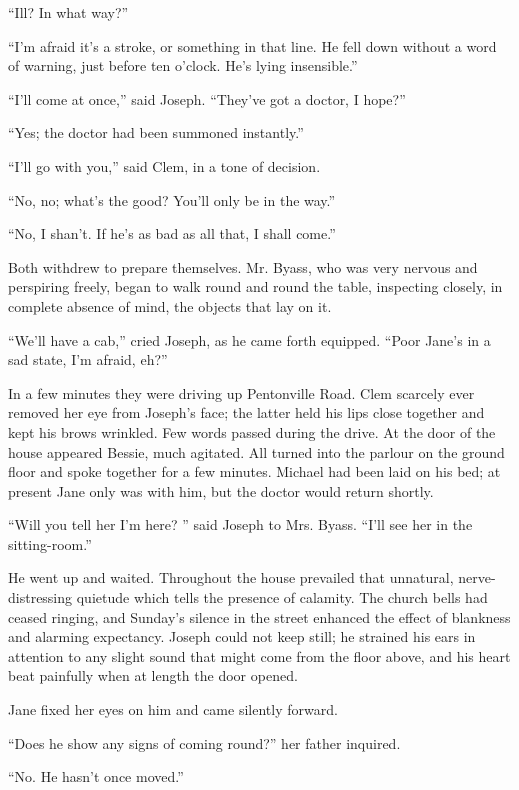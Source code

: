 ``Ill? In what way?''

``I'm afraid it's a stroke, or something in that line. He fell down
without a word of warning, just before ten o'clock. He's lying
insensible.''

``I'll come at once,'' said Joseph. ``They've got a doctor, I hope?''

``Yes; the doctor had been summoned instantly.''

``I'll go with you,'' said Clem, in a tone of decision.

``No, no; what's the good? You'll only be in the way.''

{\protect\hypertarget{161}{}{}}``No, I shan't. If he's as bad as all
that, I shall come.''

Both withdrew to prepare themselves. Mr. Byass, who was very nervous and
perspiring freely, began to walk round and round the table, inspecting
closely, in complete absence of mind, the objects that lay on it.

``We'll have a cab,'' cried Joseph, as he came forth equipped. ``Poor
Jane's in a sad state, I'm afraid, eh?''

In a few minutes they were driving up Pentonville Road. Clem scarcely
ever removed her eye from Joseph's face; the latter held his lips close
together and kept his brows wrinkled. Few words passed during the drive.
At the door of the house appeared Bessie, much agitated. All turned into
the parlour on the ground floor and spoke together for a few minutes.
Michael had been laid on his bed; at present Jane only was with him, but
the doctor would return shortly.

``Will you tell her I'm here? '' said Joseph to Mrs. Byass. ``I'll see
her in the sitting-room.''

He went up and waited. Throughout the house prevailed that unnatural,
nerve-distressing quietude which tells the presence of
{\protect\hypertarget{162}{}{}}calamity. The church bells had ceased
ringing, and Sunday's silence in the street enhanced the effect of
blankness and alarming expectancy. Joseph could not keep still; he
strained his ears in attention to any slight sound that might come from
the floor above, and his heart beat painfully when at length the door
opened.

Jane fixed her eyes on him and came silently forward.

``Does he show any signs of coming round?'' her father inquired.

``No. He hasn't once moved.''

